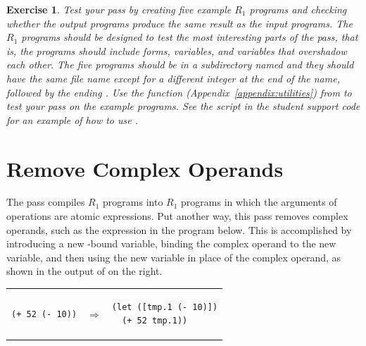 \documentclass[11pt]{book}
\newtheorem{exercise}[theorem]{Exercise}
\begin{document}
\begin{exercise}
\normalfont %

Test your  pass by creating five example $R_1$ programs
and checking whether the output programs produce the same result as
the input programs. The $R_1$ programs should be designed to test the
most interesting parts of the  pass, that is, the
programs should include  forms, variables, and variables
that overshadow each other.  The five programs should be in a
subdirectory named  and they should have the same file name
except for a different integer at the end of the name, followed by the
ending .  Use the  function
(Appendix~\ref{appendix:utilities}) from  to test
your  pass on the example programs.  See the
 script in the student support code for an example
of how to use .

\end{exercise}

\section{Remove Complex Operands}
\label{sec:remove-complex-opera-r1}

The  pass compiles $R_1$ programs into
$R_1$ programs in which the arguments of operations are atomic
expressions.  Put another way, this pass removes complex operands,
such as the expression  in the program below. This is
accomplished by introducing a new -bound variable, binding
the complex operand to the new variable, and then using the new
variable in place of the complex operand, as shown in the output of
 on the right.\\
\begin{tabular}{lll}
\begin{minipage}{0.4\textwidth}
\begin{lstlisting}
(+ 52 (- 10))
\end{lstlisting}
\end{minipage}
&
$\Rightarrow$
&
\begin{minipage}{0.4\textwidth}
\begin{lstlisting}
(let ([tmp.1 (- 10)])
  (+ 52 tmp.1))
\end{lstlisting}
\end{minipage}
\end{tabular}
\end{document}
